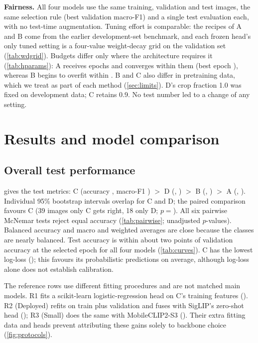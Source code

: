 \documentclass[11pt,a4paper]{article}
\begin{document}
\textbf{Fairness.}\label{sec:fairness} All four models use the same \nTrain training, \nVal validation and \nTest
test images, the same selection rule (best validation macro-F1) and a single test evaluation each, with no test-time
augmentation. Tuning effort is comparable: the recipes of A and B come from the earlier development-set benchmark,
and each frozen head's only tuned setting is a four-value weight-decay grid on the validation set (\cref{tab:wdgrid}). Budgets
differ only where the architecture requires it (\cref{tab:hparams}): A receives \maxEpochsA epochs and converges within
them (best epoch \bestA), whereas B begins to overfit within \maxEpochsB. B and C also differ in pretraining data, which we treat as
part of each method (\cref{sec:limits}). D's crop fraction 1.0 was fixed on development data; C retains 0.9. No test number led to a change of any setting.


\section{Results and model comparison}\label{sec:results}

\subsection{Overall test performance}
 gives the test metrics: C (accuracy \accC, macro-F1 \foneC) $>$ D (\accD, \foneD)
$>$ B (\accB, \foneB) $>$ A (\accA, \foneA). Individual 95\% bootstrap intervals overlap for C and D;
the paired comparison favours C (39 images only C gets right, 18 only D; $p=$\pvalCD).
All six pairwise McNemar tests reject equal accuracy (\cref{tab:pairwise}; unadjusted $p$-values).
Balanced accuracy and macro and weighted averages are close because the classes are nearly balanced.
Test accuracy is within about two points of validation accuracy at the selected epoch for all four models
(\cref{tab:curves}). C has the lowest log-loss (\loglossC); this favours its probabilistic predictions on average,
although log-loss alone does not establish calibration.

The reference rows use different fitting procedures and are not matched main models. R1 fits a scikit-learn
logistic-regression head on C's training features (\accRA). R2 (Deployed) refits on train plus validation and fuses
with SigLIP's zero-shot head (\accRB); R3 (Small) does the same with MobileCLIP2-S3 (\accRC).
Their extra fitting data and heads prevent attributing these gains solely to backbone choice (\cref{fig:protocols}).
\end{document}

